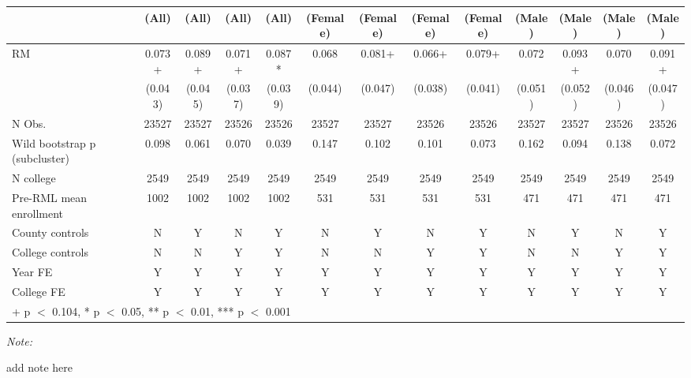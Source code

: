\begin{table}
\centering
\begin{threeparttable}
\begin{tabular}[t]{lcccccccccccc}
\toprule
  & (All) & (All)  & (All)   & (All)    & (Female) & (Female)  & (Female)   & (Female)    & (Male) & (Male)  & (Male)   & (Male)   \\
\midrule
RM & \num{0.073}+ & \num{0.089}+ & \num{0.071}+ & \num{0.087}* & \num{0.068} & \num{0.081}+ & \num{0.066}+ & \num{0.079}+ & \num{0.072} & \num{0.093}+ & \num{0.070} & \num{0.091}+\\
 & (\num{0.043}) & (\num{0.045}) & (\num{0.037}) & (\num{0.039}) & (\num{0.044}) & (\num{0.047}) & (\num{0.038}) & (\num{0.041}) & (\num{0.051}) & (\num{0.052}) & (\num{0.046}) & (\num{0.047})\\
\midrule
N Obs. & \num{23527} & \num{23527} & \num{23526} & \num{23526} & \num{23527} & \num{23527} & \num{23526} & \num{23526} & \num{23527} & \num{23527} & \num{23526} & \num{23526}\\
Wild bootstrap p (subcluster) & 0.098 & 0.061 & 0.070 & 0.039 & 0.147 & 0.102 & 0.101 & 0.073 & 0.162 & 0.094 & 0.138 & 0.072\\
N college & 2549 & 2549 & 2549 & 2549 & 2549 & 2549 & 2549 & 2549 & 2549 & 2549 & 2549 & 2549\\
Pre-RML mean enrollment & 1002 & 1002 & 1002 & 1002 & 531 & 531 & 531 & 531 & 471 & 471 & 471 & 471\\
County controls & N & Y & N & Y & N & Y & N & Y & N & Y & N & Y\\
College controls & N & N & Y & Y & N & N & Y & Y & N & N & Y & Y\\
Year FE & Y & Y & Y & Y & Y & Y & Y & Y & Y & Y & Y & Y\\
College FE & Y & Y & Y & Y & Y & Y & Y & Y & Y & Y & Y & Y\\
\bottomrule
\multicolumn{13}{l}{\rule{0pt}{1em}+ p $<$ 0.104, * p $<$ 0.05, ** p $<$ 0.01, *** p $<$ 0.001}\\
\end{tabular}
\begin{tablenotes}
\item \textit{Note: } 
\item add note here
\end{tablenotes}
\end{threeparttable}
\end{table}
